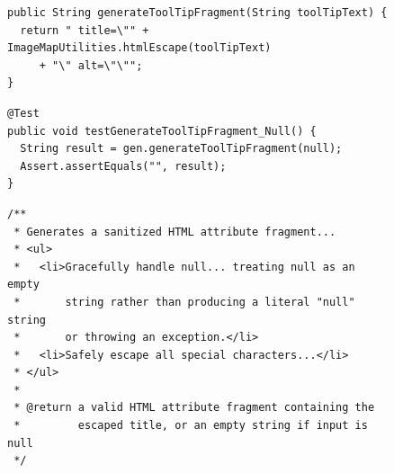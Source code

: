 \documentclass[acmsmall]{acmart}
\newcommand{\hlRange}[2]{%
  \ifnum\value{lstnumber}<#1 \else
  \ifnum\value{lstnumber}>#2 \else
    \color{bvfHL}%
  \fi\fi
}
\begin{document}
\begin{figure}[htbp!]
\vspace{-0.8em}
\begin{minipage}{1.00\textwidth}%
\centering

\begin{minipage}[t]{0.498\linewidth}%
\vspace{0pt}%
\begin{tcolorbox}[fixedbox,
    equal height group=falsealarm-method-only,
    title=Bug-free focal method]
\begin{lstlisting}[style=codeTiny]
public String generateToolTipFragment(String toolTipText) {
  return " title=\"" + ImageMapUtilities.htmlEscape(toolTipText)
     + "\" alt=\"\"";
}
\end{lstlisting}
\end{tcolorbox}%
\par\vspace{-5.0pt}%
\begin{tcolorbox}[buggybox,
    title=Test asserting the hallucinated behavior]
\begin{lstlisting}[style=codeTiny,
    linebackgroundcolor={\hlRange{4}{4}}]
@Test
public void testGenerateToolTipFragment_Null() {
  String result = gen.generateToolTipFragment(null);
  Assert.assertEquals("", result);
}
\end{lstlisting}
\end{tcolorbox}%
\end{minipage}%
\hfill%
\begin{minipage}[t]{0.493\linewidth}%
\vspace{0pt}%
\begin{tcolorbox}[docstringbox,
    title=Generated docstring with hallucinated behavior]
\begin{lstlisting}[style=codeTiny,
    linebackgroundcolor={\hlRange{4}{6}\hlRange{10}{11}}]
/**
 * Generates a sanitized HTML attribute fragment...
 * <ul>
 *   <li>Gracefully handle null... treating null as an empty
 *       string rather than producing a literal "null" string
 *       or throwing an exception.</li>
 *   <li>Safely escape all special characters...</li>
 * </ul>
 *
 * @return a valid HTML attribute fragment containing the
 *         escaped title, or an empty string if input is null
 */
\end{lstlisting}
\end{tcolorbox}%
\end{minipage}%


\end{minipage}
\end{figure}
\end{document}
